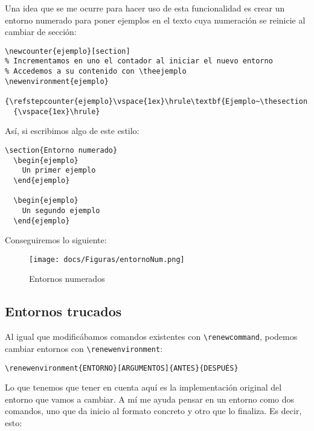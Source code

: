 Una idea que se me ocurre para hacer uso de esta funcionalidad es crear
un entorno numerado para poner ejemplos en el texto cuya numeración se
reinicie al cambiar de sección:

\begin{lstlisting}[language={[latex]tex}]
% Creamos un nuevo contador que se reinicie al cambiar de sección
\newcounter{ejemplo}[section]
% Incrementamos en uno el contador al iniciar el nuevo entorno
% Accedemos a su contenido con \theejemplo
\newenvironment{ejemplo}
  {\refstepcounter{ejemplo}\vspace{1ex}\hrule\textbf{Ejemplo~\thesection.\theejemplo}}
  {\vspace{1ex}\hrule}
\end{lstlisting}

Así, si escribimos algo de este estilo:

\begin{lstlisting}[language={[latex]tex}]
\section{Entorno numerado}
  \begin{ejemplo}
    Un primer ejemplo
  \end{ejemplo}

  \begin{ejemplo}
    Un segundo ejemplo
  \end{ejemplo}
\end{lstlisting}

Conseguiremos lo siguiente:

\begin{figure}[htbp]
\centering
\texttt{[image: docs/Figuras/entornoNum.png]}
\caption{Entornos numerados}
\end{figure}

\subsection{Entornos trucados}

Al igual que modificábamos comandos existentes con
\lstinline!\renewcommand!, podemos cambiar entornos con
\lstinline!\renewenvironment!:

\begin{lstlisting}[language={[latex]tex}]
\renewenvironment{ENTORNO}[ARGUMENTOS]{ANTES}{DESPUÉS}
\end{lstlisting}

Lo que tenemos que tener en cuenta aquí es la implementación original
del entorno que vamos a cambiar. A mí me ayuda pensar en un entorno como
dos comandos, uno que da inicio al formato concreto y otro que lo
finaliza. Es decir, esto:

